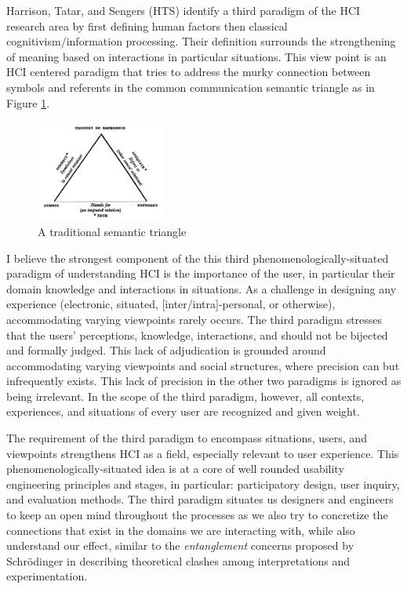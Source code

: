 \documentclass[11pt]{article}
\begin{document}
  Harrison, Tatar, and Sengers (HTS) identify a third paradigm of the HCI research area by first defining human factors then classical cognitivism/information processing.
  Their definition surrounds the strengthening of meaning based on interactions in particular situations.
  This view point is an HCI centered paradigm that tries to address the murky connection between symbols and referents in the common communication semantic triangle as in Figure \ref{fig:triangle}.

  \begin{figure}
    \begin{center}
      \includegraphics[width=0.38\textwidth]{img/semantic-triangle.png}
    \end{center}
    \caption{A traditional semantic triangle}
    \label{fig:triangle}
  \end{figure}
  I believe the strongest component of the this third phenomenologically-situated paradigm of understanding HCI is the importance of the user, in particular their domain knowledge and interactions in situations.
  As a challenge in designing any experience (electronic, situated, [inter/intra]-personal, or otherwise), accommodating varying viewpoints rarely occurs.
  The third paradigm stresses that the users' perceptions, knowledge, interactions, and should not be bijected and formally judged.
  This lack of adjudication is grounded around accommodating varying viewpoints and social structures, where precision can but infrequently exists.
  This lack of precision in the other two paradigms is ignored as being irrelevant.
  In the scope of the third paradigm, however, all contexts, experiences, and situations of every user are recognized and given weight.

  The requirement of the third paradigm to encompass situations, users, and viewpoints strengthens HCI as a field, especially relevant to user experience.
  This phenomenologically-situated idea is at a core of well rounded usability engineering principles and stages, in particular: participatory design, user inquiry, and evaluation methods.
  The third paradigm situates us designers and engineers to keep an open mind throughout the processes as we also try to concretize the connections that exist in the domains we are interacting with, while also understand our effect, similar to the \textit{entanglement} concerns proposed by Schrödinger in describing theoretical clashes among interpretations and experimentation.


\newpage
\end{document}
